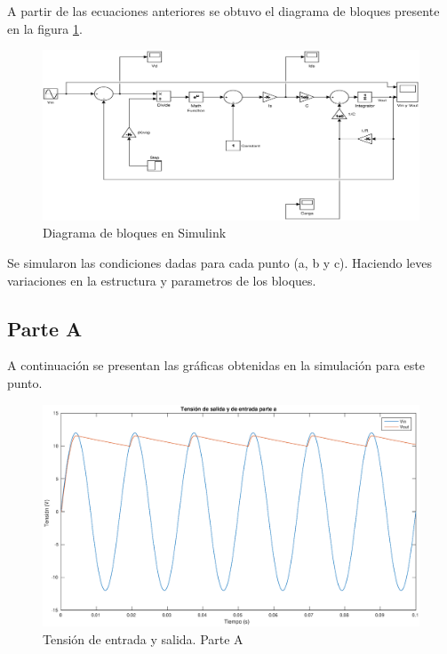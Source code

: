\documentclass[12pt,letterpaper]{article}
\begin{document}
A partir de las ecuaciones anteriores se obtuvo el diagrama de bloques presente en la figura \ref{fig:diag_bloques_2}.


\begin{figure}[ht!]
  \centering
  \includegraphics[width=0.8\linewidth]{pictures/Ejercicio2_Diagrama_Bloques.eps}
  \caption{Diagrama de bloques en Simulink}
  \label{fig:diag_bloques_2}
\end{figure}

Se simularon las condiciones dadas para cada punto (a, b y c). Haciendo leves variaciones en la estructura y parametros de los bloques.

\subsection{Parte A}
A continuación se presentan las gráficas obtenidas en la simulación para este punto. 

\begin{figure}[ht!]
  \centering
  \includegraphics[width=1.0\linewidth]{pictures/Ejercicio2_a_Vin_Vout.eps}
  \caption{Tensión de entrada y salida. Parte A}
  \label{fig:2_a_Vin_Vout}
\end{figure}
\end{document}
